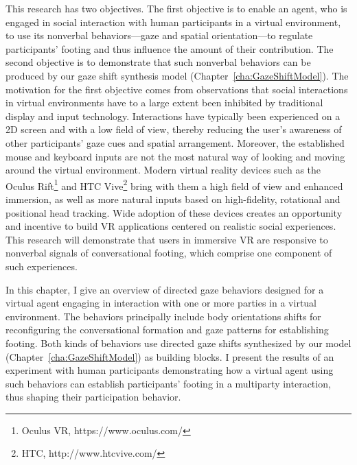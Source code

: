 This research has two objectives. The first objective is to enable an agent, who is engaged in social interaction with human participants in a virtual environment, to use its nonverbal behaviors---gaze and spatial orientation---to regulate participants' footing and thus influence the amount of their contribution. The second objective is to demonstrate that such nonverbal behaviors can be produced by our gaze shift synthesis model (Chapter~\ref{cha:GazeShiftModel}).
The motivation for the first objective comes from observations that social interactions in virtual environments have to a large extent been inhibited by traditional display and input technology. Interactions have typically been experienced on a 2D screen and with a low field of view, thereby reducing the user's awareness of other participants' gaze cues and spatial arrangement. Moreover, the established mouse and keyboard inputs are not the most natural way of looking and moving around the virtual environment. Modern virtual reality devices such as the Oculus Rift\footnote{Oculus VR, https://www.oculus.com/} and HTC Vive\footnote{HTC, http://www.htcvive.com/} bring with them a high field of view and enhanced immersion, as well as more natural inputs based on high-fidelity, rotational and positional head tracking. Wide adoption of these devices creates an opportunity and incentive to build VR applications centered on realistic social experiences. This research will demonstrate that users in immersive VR are responsive to nonverbal signals of conversational footing, which comprise one component of such experiences.

In this chapter, I give an overview of directed gaze behaviors designed for a virtual agent engaging in interaction with one or more parties in a virtual environment. The behaviors principally include body orientations shifts for reconfiguring the conversational formation and gaze patterns for establishing footing. Both kinds of behaviors use directed gaze shifts synthesized by our model (Chapter~\ref{cha:GazeShiftModel}) as building blocks. I present the results of an experiment with human participants demonstrating how a virtual agent using such behaviors can establish participants' footing in a multiparty interaction, thus shaping their participation behavior.
